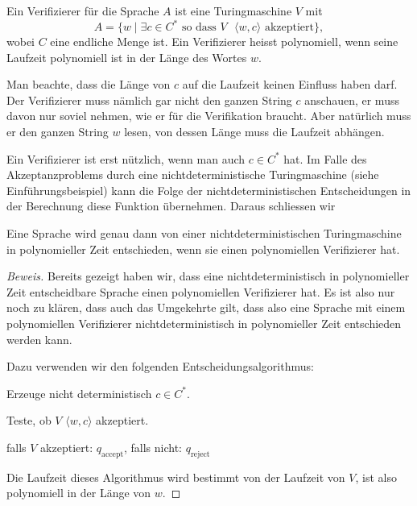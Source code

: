 \begin{definition}
%
Ein Verifizierer für die Sprache $A$ ist eine Turingmaschine
$V$ mit
\[
A=\{
w\;|\;\text{$\exists c\in C^*$ so dass $V$ $\langle w,c\rangle$ akzeptiert}
\},
\]
wobei $C$ eine endliche Menge ist.
Ein Verifizierer heisst polynomiell, wenn seine Laufzeit polynomiell
ist in der Länge des Wortes $w$.
\end{definition}

Man beachte, dass die Länge von $c$ auf die Laufzeit keinen
Einfluss haben darf.
Der Verifizierer muss nämlich gar nicht
den ganzen String $c$ anschauen, er muss davon nur soviel
nehmen, wie er für die Verifikation braucht.
Aber natürlich
muss er den ganzen String $w$ lesen, von dessen Länge muss
die Laufzeit abhängen.

Ein Verifizierer ist erst nützlich, wenn man auch $c\in C^*$
hat.
Im Falle des Akzeptanzproblems durch eine nichtdeterministische
Turingmaschine (siehe Einführungsbeispiel) kann die Folge der
nichtdeterministischen Entscheidungen in der Berechnung diese
Funktion übernehmen.
Daraus schliessen wir

\begin{satz} Eine Sprache wird genau dann von einer
nichtdeterministischen Turingmaschine in polynomieller Zeit entschieden,
wenn sie einen polynomiellen Verifizierer hat.
\end{satz}

\begin{proof}[Beweis]
Bereits gezeigt haben wir, dass eine nichtdeterministisch in
polynomieller Zeit entscheidbare Sprache einen polynomiellen Verifizierer hat.
Es ist also
nur noch zu klären, dass auch das Umgekehrte gilt, dass also eine
Sprache mit einem polynomiellen Verifizierer nichtdeterministisch
in polynomieller Zeit entschieden werden kann.

Dazu verwenden wir den folgenden Entscheidungsalgorithmus:
\begin{compactenum}
\item Erzeuge nicht deterministisch $c\in C^*$.
\item Teste, ob $V$ $\langle w,c\rangle$ akzeptiert.
\item falls $V$ akzeptiert: $q_{\text{accept}}$, falls nicht:
$q_{\text{reject}}$
\end{compactenum}
Die Laufzeit dieses Algorithmus wird bestimmt von der Laufzeit von $V$,
ist also polynomiell in der Länge von $w$.
\end{proof}

